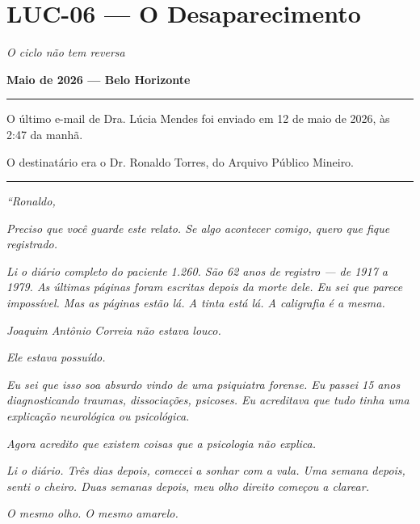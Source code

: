 \section*{\textbf{LUC-06} --- O Desaparecimento}

\noindent \textit{O ciclo não tem reversa}

\noindent \textbf{Maio de 2026 --- Belo Horizonte}

\vspace{0.5em}\noindent\rule{\textwidth}{0.5pt}\vspace{0.5em}

\noindent O último e-mail de Dra. Lúcia Mendes foi enviado em 12 de maio de 2026, às 2:47 da manhã.

\noindent O destinatário era o Dr. Ronaldo Torres, do Arquivo Público Mineiro.

\vspace{0.5em}\noindent\rule{\textwidth}{0.5pt}\vspace{0.5em}

\noindent \textit{\textquotedblleft{}Ronaldo,}

\noindent \textit{Preciso que você guarde este relato. Se algo acontecer comigo, quero que fique registrado.}

\noindent \textit{Li o diário completo do paciente 1.260. São 62 anos de registro --- de 1917 a 1979. As últimas páginas foram escritas depois da morte dele. Eu sei que parece impossível. Mas as páginas estão lá. A tinta está lá. A caligrafia é a mesma.}

\noindent \textit{Joaquim Antônio Correia não estava louco.}

\noindent \textit{Ele estava possuído.}

\noindent \textit{Eu sei que isso soa absurdo vindo de uma psiquiatra forense. Eu passei 15 anos diagnosticando traumas, dissociações, psicoses. Eu acreditava que tudo tinha uma explicação neurológica ou psicológica.}

\noindent \textit{Agora acredito que existem coisas que a psicologia não explica.}

\noindent \textit{Li o diário. Três dias depois, comecei a sonhar com a vala. Uma semana depois, senti o cheiro. Duas semanas depois, meu olho direito começou a clarear.}

\noindent \textit{O mesmo olho. O mesmo amarelo.}


